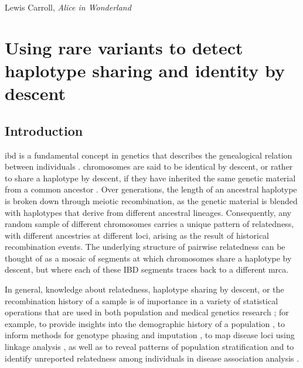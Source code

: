 
\glsresetall

%
{Lewis Carroll, \textit{Alice in Wonderland}}

{
\singlespacing
\chapter{Using rare variants to detect haplotype sharing and identity by descent}
\label{ch:sharedhap}
\minitoc
}

%
\section{Introduction}
%

\Gls{ibd} is a fundamental concept in genetics that describes the genealogical relation between individuals \citep{malecot1948mathematics}.
 chromosomes are said to be identical by descent, or rather to share a haplotype by descent, if they have inherited the same genetic material from a common ancestor \citep[\eg, see][]{Browning:2012cx,Thompson:2013cj}.
Over generations, the length of an ancestral haplotype is broken down through meiotic recombination, as the genetic material is blended with haplotypes that derive from different ancestral lineages.
Consequently, any random sample of  different chromosomes carries a unique pattern of relatedness, with different ancestries at different loci, arising as the result of historical recombination events.
The underlying structure of pairwise relatedness can be thought of as a mosaic of segments at which  chromosomes share a haplotype by descent, but where each of these IBD segments traces back to a different \gls{mrca}.

In general, knowledge about relatedness, haplotype sharing by descent, or the recombination history of a sample is of importance in a variety of statistical operations that are used in both population and medical genetics research \citep{Milligan:2003bd,Albrechtsen:2009cb,Gusev:2009hd}; for example, to provide insights into the demographic history of a population \citep{Harris:2013id}, to inform methods for genotype phasing and imputation \citep{Kong:2008gh}, to map disease loci using linkage analysis \citep{Purcell:2007dg,Albrechtsen:2009cb}, as well as to reveal patterns of population stratification and to identify unreported relatedness among individuals in disease association analysis \citep{Freedman:2004dk,Price:2006cd,Choi:2009fm,Mathieson:2012hb}.

